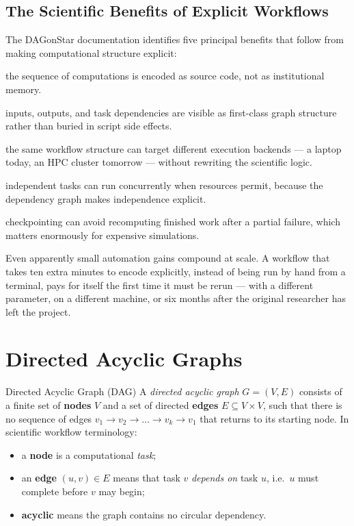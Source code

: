 \subsection{The Scientific Benefits of Explicit Workflows}

The DAGonStar documentation identifies five principal benefits that follow
from making computational structure explicit:

\begin{description}[leftmargin=1.6em,style=nextline]
  \item[Reproducibility] the sequence of computations is encoded as source
    code, not as institutional memory.
  \item[Traceability] inputs, outputs, and task dependencies are visible as
    first-class graph structure rather than buried in script side effects.
  \item[Portability] the same workflow structure can target different
    execution backends --- a laptop today, an HPC cluster tomorrow --- without
    rewriting the scientific logic.
  \item[Parallelism] independent tasks can run concurrently when resources
    permit, because the dependency graph makes independence explicit.
  \item[Recoverability] checkpointing can avoid recomputing finished work
    after a partial failure, which matters enormously for expensive
    simulations.
\end{description}

\begin{practicebox}
Even apparently small automation gains compound at scale. A workflow that
takes ten extra minutes to encode explicitly, instead of being run by hand
from a terminal, pays for itself the first time it must be rerun --- with a
different parameter, on a different machine, or six months after the original
researcher has left the project.
\end{practicebox}

\section{Directed Acyclic Graphs}
\label{sec:dag-theory}

\begin{definitionbox}{Directed Acyclic Graph (DAG)}
A \emph{directed acyclic graph} $G = (V, E)$ consists of a finite set of
\textbf{nodes} $V$ and a set of directed \textbf{edges} $E \subseteq V \times
V$, such that there is no sequence of edges
$v_1 \to v_2 \to \dots \to v_k \to v_1$ that returns to its starting node. In
scientific workflow terminology:
\begin{itemize}
  \item a \textbf{node} is a computational \emph{task};
  \item an \textbf{edge} $(u,v) \in E$ means that task $v$ \emph{depends on}
    task $u$, i.e.\ $u$ must complete before $v$ may begin;
  \item \textbf{acyclic} means the graph contains no circular dependency.
\end{itemize}
\end{definitionbox}

